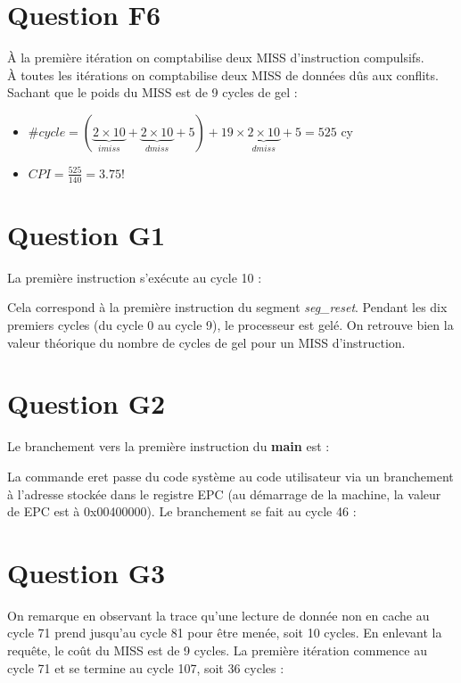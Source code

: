 \documentclass[10pt]{article}
\begin{document}
\section{Question F6}
À la première itération on comptabilise deux MISS d'instruction compulsifs.\\
À toutes les itérations on comptabilise deux MISS de données dûs aux conflits.\\
Sachant que le poids du MISS est de 9 cycles de gel :
\begin{itemize}
  \item $\#cycle=(\underbrace{2\times{10}}_{imiss}+
    \underbrace{2\times{10}}_{dmiss}+5)+
    {19}\times\underbrace{2\times{10}}_{dmiss}+5=525$ cy
  \item ${CPI}=\frac{525}{140}=3.75$!
\end{itemize}

\section{Question G1}
La première instruction s'exécute au cycle 10 :

Cela correspond à la première instruction du segment {\it seg\_reset}. Pendant
les dix premiers cycles (du cycle 0 au cycle 9), le processeur est gelé. On
retrouve bien la valeur théorique du nombre de cycles de gel pour un MISS
d'instruction.

\section{Question G2}
Le branchement vers la première instruction du {\bf main} est :

La commande eret passe du code système au code utilisateur via un branchement
à l'adresse stockée dans le registre EPC (au démarrage de la machine, la valeur
de EPC est à 0x00400000). Le branchement se fait au cycle 46 :


\newpage

\section{Question G3}
On remarque en observant la trace qu'une lecture de donnée non en cache au
cycle 71 prend jusqu'au cycle 81 pour être menée, soit 10 cycles. En enlevant
la requête, le coût du MISS est de 9 cycles.
La première itération commence au cycle 71 et se termine au cycle 107, soit
36 cycles :


\newpage
\end{document}
